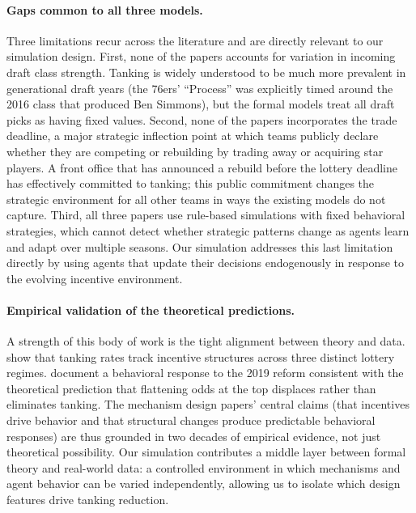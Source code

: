 \documentclass{article}
\begin{document}
\paragraph{Gaps common to all three models.}
Three limitations recur across the literature and are directly relevant to
our simulation design.
First, none of the papers accounts for variation in incoming draft class
strength.
Tanking is widely understood to be much more prevalent in generational draft
years (the 76ers' ``Process'' was explicitly timed around the 2016 class
that produced Ben Simmons), but the formal models treat all draft picks as
having fixed values.
Second, none of the papers incorporates the trade deadline, a major
strategic inflection point at which teams publicly declare whether they are
competing or rebuilding by trading away or acquiring star players.
A front office that has announced a rebuild before the lottery deadline has
effectively committed to tanking; this public commitment changes the
strategic environment for all other teams in ways the existing models do not
capture.
Third, all three papers use rule-based simulations with fixed behavioral
strategies, which cannot detect whether strategic patterns change as agents
learn and adapt over multiple seasons.
Our simulation addresses this last limitation directly by using agents that
update their decisions endogenously in response to the evolving incentive
environment.

\paragraph{Empirical validation of the theoretical predictions.}
A strength of this body of work is the tight alignment between theory and
data.
\citet{taylor2002} show that tanking rates track incentive structures across
three distinct lottery regimes.
\citet{schmidt2024} document a behavioral response to the 2019 reform
consistent with the theoretical prediction that flattening odds at the top
displaces rather than eliminates tanking.
The mechanism design papers' central claims (that incentives drive behavior
and that structural changes produce predictable behavioral responses) are
thus grounded in two decades of empirical evidence, not just theoretical
possibility.
Our simulation contributes a middle layer between formal theory and real-world
data: a controlled environment in which mechanisms and agent behavior can be
varied independently, allowing us to isolate which design features drive
tanking reduction.


\end{document}
